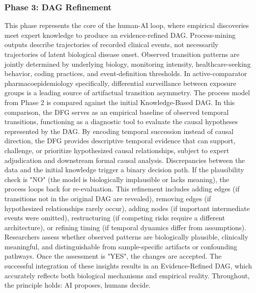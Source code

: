 \documentclass[sn-vancouver-num]{sn-jnl}
\begin{document}
\subsubsection{Phase 3: DAG Refinement}
This phase represents the core of the human-AI loop, where empirical discoveries meet expert knowledge to produce an evidence-refined DAG. Process-mining outputs describe trajectories of recorded clinical events, not necessarily trajectories of latent biological disease onset. Observed transition patterns are jointly determined by underlying biology, monitoring intensity, healthcare-seeking behavior, coding practices, and event-definition thresholds. In active-comparator pharmacoepidemiology specifically, differential surveillance between exposure groups is a leading source of artifactual transition asymmetry. The process model from Phase 2 is compared against the initial Knowledge-Based DAG. In this comparison, the DFG serves as an empirical baseline of observed temporal transitions, functioning as a diagnostic tool to evaluate the causal hypotheses represented by the DAG. By encoding temporal succession instead of causal direction, the DFG provides descriptive temporal evidence that can support, challenge, or prioritize hypothesized causal relationships, subject to expert adjudication and downstream formal causal analysis. Discrepancies between the data and the initial knowledge trigger a binary decision path. If the plausibility check is "NO" (the model is biologically implausible or lacks meaning), the process loops back for re-evaluation. This refinement includes adding edges (if transitions not in the original DAG are revealed), removing edges (if hypothesized relationships rarely occur), adding nodes (if important intermediate events were omitted), restructuring (if competing risks require a different architecture), or refining timing (if temporal dynamics differ from assumptions). Researchers assess whether observed patterns are biologically plausible, clinically meaningful, and distinguishable from sample-specific artifacts or confounding pathways. Once the assessment is "YES", the changes are accepted. The successful integration of these insights results in an Evidence-Refined DAG, which accurately reflects both biological mechanisms and empirical reality. Throughout, the principle holds: AI proposes, humans decide.
\end{document}
